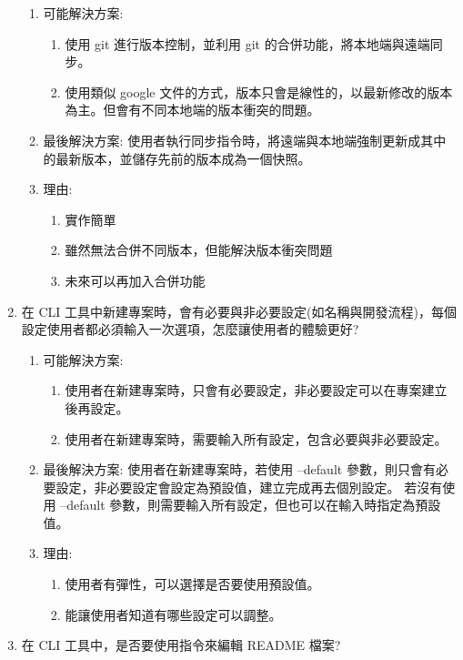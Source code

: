 \documentclass{report}
\begin{document}
\begin{enumerate}
			\begin{enumerate}
				\item 可能解決方案:
					\begin{enumerate}
						\item 使用 git 進行版本控制，並利用 git 的合併功能，將本地端與遠端同步。
						\item 使用類似 google 文件的方式，版本只會是線性的，以最新修改的版本為主。但會有不同本地端的版本衝突的問題。
					\end{enumerate}
				\item 最後解決方案: 使用者執行同步指令時，將遠端與本地端強制更新成其中的最新版本，並儲存先前的版本成為一個快照。
				\item 理由:
					\begin{enumerate}
						\item 實作簡單
						\item 雖然無法合併不同版本，但能解決版本衝突問題
						\item 未來可以再加入合併功能
					\end{enumerate}	
			\end{enumerate}		
			\item 在 CLI 工具中新建專案時，會有必要與非必要設定(如名稱與開發流程)，每個設定使用者都必須輸入一次選項，怎麼讓使用者的體驗更好?
			\begin{enumerate}
				\item 可能解決方案:
					\begin{enumerate}
					\item 使用者在新建專案時，只會有必要設定，非必要設定可以在專案建立後再設定。
					\item 使用者在新建專案時，需要輸入所有設定，包含必要與非必要設定。
					\end{enumerate}
				\item 最後解決方案:
				使用者在新建專案時，若使用 --default 參數，則只會有必要設定，非必要設定會設定為預設值，建立完成再去個別設定。
				若沒有使用 --default 參數，則需要輸入所有設定，但也可以在輸入時指定為預設值。
				\item 理由:
					\begin{enumerate}
						\item 使用者有彈性，可以選擇是否要使用預設值。
						\item 能讓使用者知道有哪些設定可以調整。
					\end{enumerate}
			\end{enumerate}
			\item 在 CLI 工具中，是否要使用指令來編輯 README 檔案?
				\begin{enumerate}

\end{enumerate}
\end{enumerate}
\end{document}
